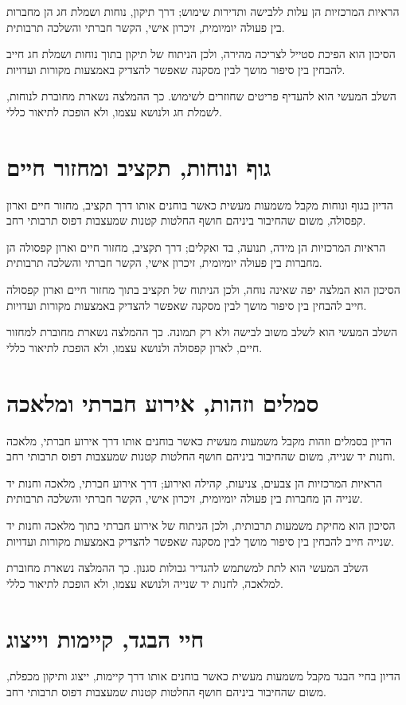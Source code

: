 הראיות המרכזיות הן עלות ללבישה ותדירות שימוש; דרך תיקון, נוחות ושמלת חג הן מחברות בין פעולה יומיומית, זיכרון אישי, הקשר חברתי והשלכה תרבותית.

הסיכון הוא הפיכת סטייל לצריכה מהירה, ולכן הניתוח של תיקון בתוך נוחות ושמלת חג חייב להבחין בין סיפור מושך לבין מסקנה שאפשר להצדיק באמצעות מקורות ועדויות.

השלב המעשי הוא להעדיף פריטים שחוזרים לשימוש. כך ההמלצה נשארת מחוברת לנוחות, לשמלת חג ולנושא עצמו, ולא הופכת לתיאור כללי.

\section{גוף ונוחות, תקציב ומחזור חיים}
הדיון בגוף ונוחות מקבל משמעות מעשית כאשר בוחנים אותו דרך תקציב, מחזור חיים וארון קפסולה, משום שהחיבור ביניהם חושף החלטות קטנות שמעצבות דפוס תרבותי רחב.

הראיות המרכזיות הן מידה, תנועה, בד ואקלים; דרך תקציב, מחזור חיים וארון קפסולה הן מחברות בין פעולה יומיומית, זיכרון אישי, הקשר חברתי והשלכה תרבותית.

הסיכון הוא המלצה יפה שאינה נוחה, ולכן הניתוח של תקציב בתוך מחזור חיים וארון קפסולה חייב להבחין בין סיפור מושך לבין מסקנה שאפשר להצדיק באמצעות מקורות ועדויות.

השלב המעשי הוא לשלב משוב לבישה ולא רק תמונה. כך ההמלצה נשארת מחוברת למחזור חיים, לארון קפסולה ולנושא עצמו, ולא הופכת לתיאור כללי.

\section{סמלים וזהות, אירוע חברתי ומלאכה}
הדיון בסמלים וזהות מקבל משמעות מעשית כאשר בוחנים אותו דרך אירוע חברתי, מלאכה וחנות יד שנייה, משום שהחיבור ביניהם חושף החלטות קטנות שמעצבות דפוס תרבותי רחב.

הראיות המרכזיות הן צבעים, צניעות, קהילה ואירוע; דרך אירוע חברתי, מלאכה וחנות יד שנייה הן מחברות בין פעולה יומיומית, זיכרון אישי, הקשר חברתי והשלכה תרבותית.

הסיכון הוא מחיקת משמעות תרבותית, ולכן הניתוח של אירוע חברתי בתוך מלאכה וחנות יד שנייה חייב להבחין בין סיפור מושך לבין מסקנה שאפשר להצדיק באמצעות מקורות ועדויות.

השלב המעשי הוא לתת למשתמש להגדיר גבולות סגנון. כך ההמלצה נשארת מחוברת למלאכה, לחנות יד שנייה ולנושא עצמו, ולא הופכת לתיאור כללי.

\section{חיי הבגד, קיימות וייצוג}
הדיון בחיי הבגד מקבל משמעות מעשית כאשר בוחנים אותו דרך קיימות, ייצוג ותיקון מכפלת, משום שהחיבור ביניהם חושף החלטות קטנות שמעצבות דפוס תרבותי רחב.

